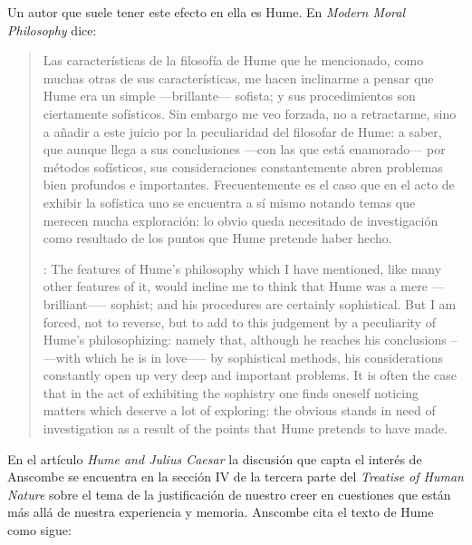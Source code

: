   Un autor que suele tener este efecto en ella es Hume. En \emph{Modern Moral
    Philosophy} dice:

  \blockquote[{\cite[172]{anscombe1981mmph}}: The features of Hume’s philosophy
  which I have mentioned, like many other features of it, would incline me to
  think that Hume was a mere ---brilliant--— sophist; and his procedures are
  certainly sophistical. But I am forced, not to reverse, but to add to this
  judgement by a peculiarity of Hume’s philosophizing: namely that, although he
  reaches his conclusions --—with which he is in love--— by sophistical methods,
  his considerations constantly open up very deep and important problems. It is
  often the case that in the act of exhibiting the sophistry one finds oneself
  noticing matters which deserve a lot of exploring: the obvious stands in need of
  investigation as a result of the points that Hume pretends to have made.]{Las
    características de la filosofía de Hume que he mencionado, como muchas otras
    de sus características, me hacen inclinarme a pensar que Hume era un simple
    ---brillante--- sofista; y sus procedimientos son ciertamente sofísticos. Sin
    embargo me veo forzada, no a retractarme, sino a añadir a este juicio por la
    peculiaridad del filosofar de Hume: a saber, que aunque llega a sus
    conclusiones ---con las que está enamorado--- por métodos sofísticos, sus
    consideraciones constantemente abren problemas bien profundos e importantes.
    Frecuentemente es el caso que en el acto de exhibir la sofística uno se
    encuentra a sí mismo notando temas que merecen mucha exploración: lo obvio
    queda necesitado de investigación como resultado de los puntos que Hume
    pretende haber hecho.}

En el artículo \emph{Hume and Julius Caesar} la discusión que capta el interés
de Anscombe se encuentra en la sección IV de la tercera parte del \emph{Treatise
  of Human Nature} sobre el tema de la justificación de nuestro creer en
cuestiones que están más allá de nuestra experiencia y memoria. Anscombe cita el
texto de Hume como sigue:

